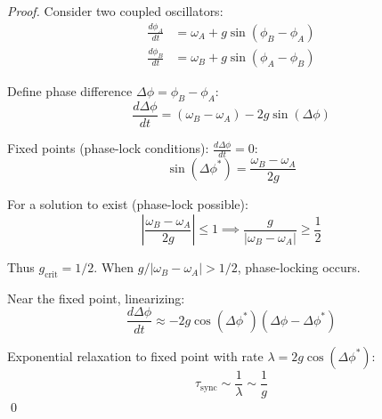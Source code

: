 \begin{proof}
Consider two coupled oscillators:
\begin{align}
\frac{d\phi_A}{dt} &= \omega_A + g \sin(\phi_B - \phi_A) \\
\frac{d\phi_B}{dt} &= \omega_B + g \sin(\phi_A - \phi_B)
\end{align}

Define phase difference $\Delta\phi = \phi_B - \phi_A$:
\begin{equation}
\frac{d\Delta\phi}{dt} = (\omega_B - \omega_A) - 2g \sin(\Delta\phi)
\end{equation}

Fixed points (phase-lock conditions): $\frac{d\Delta\phi}{dt} = 0$:
\begin{equation}
\sin(\Delta\phi^*) = \frac{\omega_B - \omega_A}{2g}
\end{equation}

For a solution to exist (phase-lock possible):
\begin{equation}
\left|\frac{\omega_B - \omega_A}{2g}\right| \leq 1 \implies \frac{g}{|\omega_B - \omega_A|} \geq \frac{1}{2}
\end{equation}

Thus $g_{\text{crit}} = 1/2$. When $g/|\omega_B - \omega_A| > 1/2$, phase-locking occurs.

Near the fixed point, linearizing:
\begin{equation}
\frac{d\Delta\phi}{dt} \approx -2g \cos(\Delta\phi^*) (\Delta\phi - \Delta\phi^*)
\end{equation}

Exponential relaxation to fixed point with rate $\lambda = 2g \cos(\Delta\phi^*)$:
\begin{equation}
\tau_{\text{sync}} \sim \frac{1}{\lambda} \sim \frac{1}{g}
\end{equation}
\qed
\end{proof}

